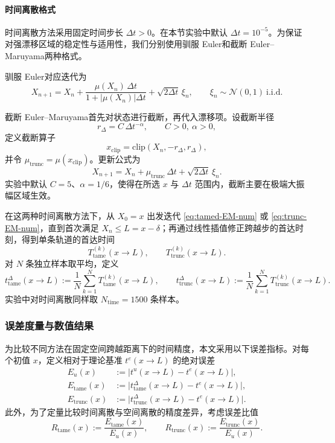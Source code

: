 \paragraph{时间离散格式}

时间离散方法采用固定时间步长 \(\Delta t>0\)。在本节实验中默认 \(\Delta t=10^{-5}\)。为保证对强漂移区域的稳定性与适用性，我们分别使用驯服 Euler和截断 Euler–Maruyama两种格式。

驯服 Euler对应迭代为
\begin{equation}\label{eq:tamed-EM-num}
	X_{n+1}
	= X_n
	+ \frac{\mu(X_n)\,\Delta t}{1+|\mu(X_n)|\Delta t}
	+ \sqrt{2\Delta t}\,\xi_n,\qquad
	\xi_n\sim\mathcal{N}(0,1)\ \text{i.i.d.}
\end{equation}

截断 Euler–Maruyama首先对状态进行截断，再代入漂移项。设截断半径
\[
r_\Delta = C\,\Delta t^{-\alpha},\qquad C>0,\ \alpha>0,
\]
定义截断算子
\[
x_{\mathrm{clip}} = \mathrm{clip}(X_n,-r_\Delta,r_\Delta),
\]
并令 \(\mu_{\mathrm{trunc}} = \mu(x_{\mathrm{clip}})\)。更新公式为
\begin{equation}\label{eq:trunc-EM-num}
	X_{n+1}
	= X_n
	+ \mu_{\mathrm{trunc}}\,\Delta t
	+ \sqrt{2\Delta t}\,\xi_n.
\end{equation}
实验中默认 \(C=5\)、\(\alpha=1/6\)，使得在所选 \(x\) 与 \(\Delta t\) 范围内，截断主要在极端大振幅区域生效。%

在这两种时间离散方法下，从 \(X_0=x\) 出发迭代 \eqref{eq:tamed-EM-num} 或 \eqref{eq:trunc-EM-num}，直到首次满足 \(X_n\le L=x-\delta\)；再通过线性插值修正跨越步的首达时刻，得到单条轨道的首达时间
\[
T^{(k)}_{\mathrm{tame}}(x\to L),\qquad
T^{(k)}_{\mathrm{trunc}}(x\to L).
\]
对 \(N\) 条独立样本取平均，定义
\[
t^{\Delta}_{\mathrm{tame}}(x\to L)
:= \frac{1}{N}\sum_{k=1}^{N}T^{(k)}_{\mathrm{tame}}(x\to L),\qquad
t^{\Delta}_{\mathrm{trunc}}(x\to L)
:= \frac{1}{N}\sum_{k=1}^{N}T^{(k)}_{\mathrm{trunc}}(x\to L).
\]
实验中对时间离散同样取 \(N_{\mathrm{time}}=1500\) 条样本。

\subsubsection{误差度量与数值结果}

为比较不同方法在固定空间跨越距离下的时间精度，本文采用以下误差指标。对每个初值 \(x\)，定义相对于理论基准 \(t^e(x\to L)\) 的绝对误差
\begin{align}
	E_u(x) 
	&:= \big|t^u(x\to L)-t^e(x\to L)\big|,\\
	E_{\mathrm{tame}}(x)
	&:= \big|t^{\Delta}_{\mathrm{tame}}(x\to L)-t^e(x\to L)\big|,\\
	E_{\mathrm{trunc}}(x)
	&:= \big|t^{\Delta}_{\mathrm{trunc}}(x\to L)-t^e(x\to L)\big|.
\end{align}
此外，为了定量比较时间离散与空间离散的精度差异，考虑误差比值
\begin{equation}
	R_{\mathrm{tame}}(x)
	:= \frac{E_{\mathrm{tame}}(x)}{E_u(x)},\qquad
	R_{\mathrm{trunc}}(x)
	:= \frac{E_{\mathrm{trunc}}(x)}{E_u(x)}.
\end{equation}


